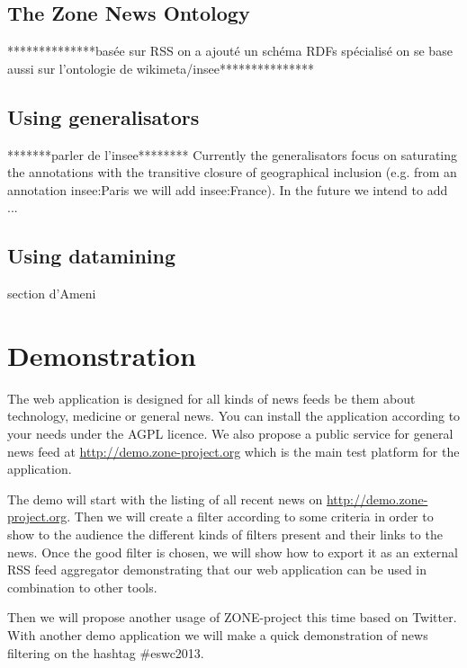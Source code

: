 \documentclass{llncs}
\begin{document}
%
\subsection{The Zone News Ontology}
%



**************basée sur RSS
on a ajouté un schéma RDFs spécialisé
on se base aussi sur l'ontologie de wikimeta/insee***************
%

%
\subsection{Using generalisators}
*******parler de l'insee********
Currently the generalisators focus on saturating the annotations with the transitive closure of geographical inclusion (e.g. from an annotation insee:Paris we will add insee:France). 
In the future we intend to add ...
 

%
\subsection{Using datamining}
section d'Ameni

\section{Demonstration}
%
The web application is designed for all kinds of news feeds be them about technology, medicine or general news. You can install the application according to your needs under the AGPL licence. We also propose a public service for general news feed at \url{http://demo.zone-project.org} which is the main test platform for the application.

The demo will start with the listing of all recent news on \url{http://demo.zone-project.org}. Then we will create a filter according to some criteria in order to show to the audience the different kinds of filters present and their links to the news. Once the good filter is chosen, we will show how to export it as an external RSS feed aggregator demonstrating that our web application can be used in combination to other tools.

Then we will propose another usage of ZONE-project this time based on Twitter. With another demo application we will make a quick demonstration of news filtering on the hashtag #eswc2013.
\end{document}
